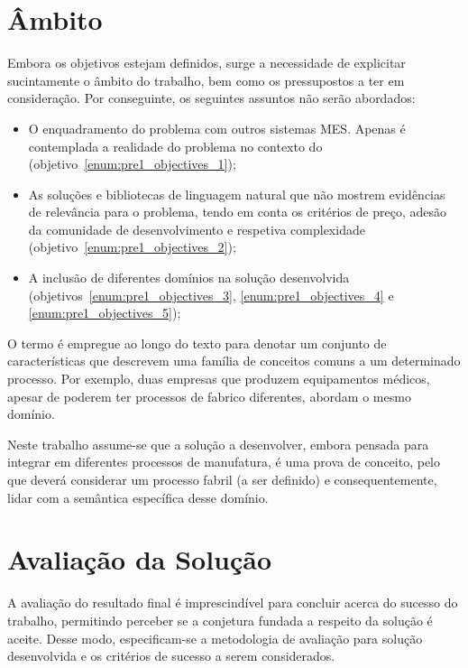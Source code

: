 \section{Âmbito}

Embora os objetivos estejam definidos, surge a necessidade de explicitar sucintamente o âmbito do trabalho, bem como os pressupostos a ter em consideração. Por conseguinte, os seguintes assuntos não serão abordados:

\begin{itemize}
    \item
    {
        O enquadramento do problema com outros sistemas \gls{MES}. Apenas é contemplada a realidade do problema no contexto do {\productname} (objetivo~\ref{enum:pre1_objectives_1});
    }
    \item
    {
        As soluções e bibliotecas de linguagem natural que não mostrem evidências de relevância para o problema, tendo em conta os critérios de preço, adesão da comunidade de desenvolvimento e respetiva complexidade (objetivo~\ref{enum:pre1_objectives_2});
    }
    \item 
    {
        A inclusão de diferentes domínios na solução desenvolvida (objetivos~\ref{enum:pre1_objectives_3}, \ref{enum:pre1_objectives_4} e \ref{enum:pre1_objectives_5});
    }
\end{itemize}

O termo  é empregue ao longo do texto para denotar um conjunto de características que descrevem uma família de conceitos comuns a um determinado processo. Por exemplo, duas empresas que produzem equipamentos médicos, apesar de poderem ter processos de fabrico diferentes, abordam o mesmo domínio.

Neste trabalho assume-se que a solução a desenvolver, embora pensada para integrar em diferentes processos de manufatura, é uma prova de conceito, pelo que deverá considerar um processo fabril (a ser definido) e consequentemente, lidar com a semântica específica desse domínio.

\section{Avaliação da Solução}
\label{sec:pre1_solutionevaluation}

A avaliação do resultado final é imprescindível para concluir acerca do sucesso do trabalho, permitindo perceber se a conjetura fundada a respeito da solução é aceite. Desse modo, especificam-se a metodologia de avaliação para solução desenvolvida e os critérios de sucesso a serem considerados.

